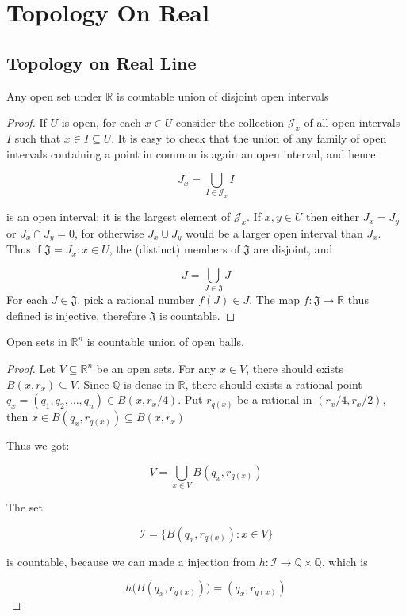 \section{Topology On Real}

\subsection{Topology on Real Line}

\begin{thm}
    Any open set under $\mathbb{R}$ is countable union
    of disjoint open intervals
\end{thm}

\begin{proof}
    If $U$ is open, for each $x \in U$ consider the collection $\mathcal{J}_x$ of all open
intervals $I$ such that $x \in I \subseteq U$. It is easy to check that the union of any family
of open intervals containing a point in common is again an open interval, and hence

\[
    J_x = \bigcup_{I \in \mathcal{J}_x} I
\]

is an open interval; it is the largest element of $\mathcal{J}_x$. If $x, y \in U$ then
either $J_x = J_y$ or $J_x \cap J_y = 0$, for otherwise $J_x \cup J_y$ 
would be a larger open interval
than $J_x$. Thus if $\mathfrak{J} = { J_x : x \in U}$, the (distinct) members of $\mathfrak{J}$ are disjoint,
and 

\[
J = \bigcup_{J \in \mathfrak{J}} J
\]
For each $J \in \mathfrak{J}$, pick a rational number $f(J) \in J$. The map
$f : \mathfrak{J} \to \mathbb{R}$ thus defined is injective,  therefore $\mathfrak{J}$ is
countable.
\end{proof}

\begin{thm}
    Open sets in $\mathbb{R}^n$ is countable union of open balls.
\end{thm}

\begin{proof}
   Let $V \subseteq \mathbb{R}^n$ be an open sets. For any $x \in V$, there should exists $B(x, r_x) \subseteq V$. 
   Since $\mathbb{Q}$ is dense in $\mathbb{R}$, there should exists a rational point $q_x = (q_1,q_2,\dots,q_n) \in B(x, r_x/4)$.
   Put $r_{q(x)}$ be a rational in $(r_x /4 ,r_x/2)$, then $x \in B(q_x, r_{q(x)}) \subseteq B(x, r_x)$

   Thus we got:

   \[
    V = \bigcup_{x \in V} B(q_x ,r_{q(x)})
   \]

   The set

   \[
    \mathcal{I} = \{ B(q_x, r_{q(x)}): x \in V\}
   \]

   is countable, because we can made a injection from $h: \mathcal{I} \to \mathbb{Q} \times \mathbb{Q}$, which is 

   \[
    h\Big(B(q_x, r_{q(x)})\Big) = (q_x, r_{q(x)})
   \]
\end{proof}
